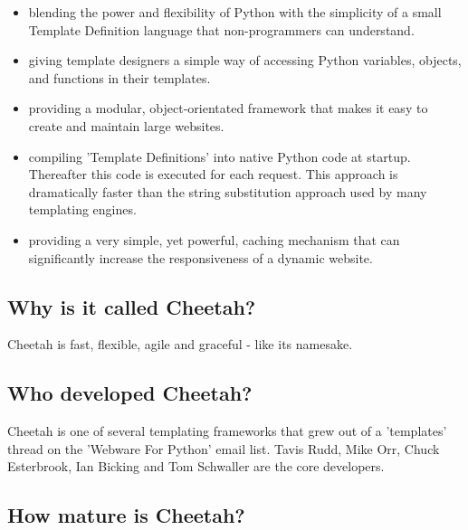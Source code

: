 \begin{itemize}     
     
\item blending the power and flexibility of Python with the simplicity of a
     small Template Definition language that non-programmers can understand.
     
\item giving template designers a simple way of accessing Python variables,
     objects, and functions in their templates.
     
\item providing a modular, object-orientated framework that makes it easy to
     create and maintain large websites.
     
\item compiling 'Template Definitions' into native Python code at startup.
     Thereafter this code is executed for each request.  This approach is
     dramatically faster than the string substitution approach used by many
     templating engines.

\item providing a very simple, yet powerful, caching mechanism that can
     significantly increase the responsiveness of a dynamic website.

\end{itemize}


\subsection{Why is it called Cheetah?}
\label{intro.name}

Cheetah is fast, flexible, agile and graceful - like its namesake. 


\subsection{Who developed Cheetah?}
\label{intro.developers}

Cheetah is one of several templating frameworks that grew out of a 'templates'
thread on the 'Webware For Python' email list.  Tavis Rudd, Mike Orr, Chuck
Esterbrook, Ian Bicking and Tom Schwaller are the core developers.

\subsection{How mature is Cheetah?}
\label{intro.mature}

